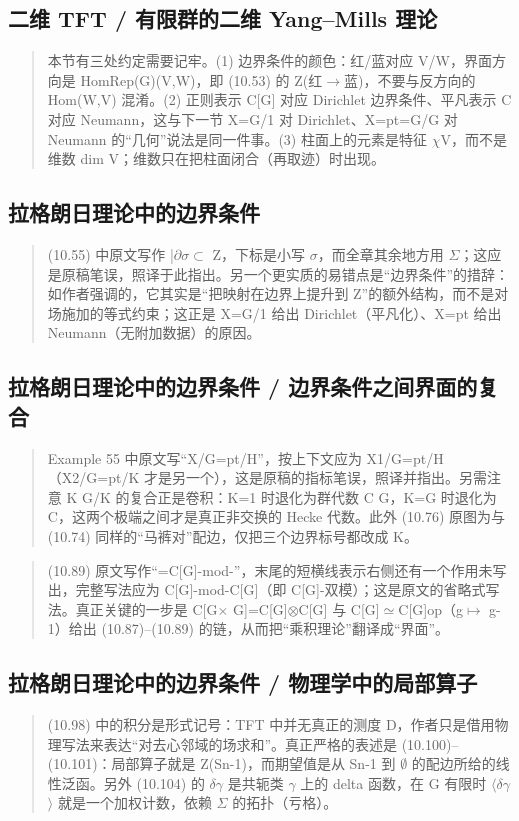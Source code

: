 \subsection*{二维 TFT / 有限群的二维 Yang--Mills 理论}
\begin{quote}\small
本节有三处约定需要记牢。(1) 边界条件的颜色：红/蓝对应 V/W，界面方向是 HomRep(G)(V,W)，即 (10.53) 的 Z(红$\to$蓝)，不要与反方向的 Hom(W,V) 混淆。(2) 正则表示 C[G] 对应 Dirichlet 边界条件、平凡表示 C 对应 Neumann，这与下一节 X=G/1 对 Dirichlet、X=pt=G/G 对 Neumann 的“几何”说法是同一件事。(3) 柱面上的元素是特征 $\chi$V，而不是维数 dim V；维数只在把柱面闭合（再取迹）时出现。
\end{quote}

\subsection*{拉格朗日理论中的边界条件}
\begin{quote}\small
(10.55) 中原文写作 |$\partial$$\sigma$$\subset$ Z，下标是小写 $\sigma$，而全章其余地方用 $\Sigma$；这应是原稿笔误，照译于此指出。另一个更实质的易错点是“边界条件”的措辞：如作者强调的，它其实是“把映射在边界上提升到 Z”的额外结构，而不是对场施加的等式约束；这正是 X=G/1 给出 Dirichlet（平凡化）、X=pt 给出 Neumann（无附加数据）的原因。
\end{quote}

\subsection*{拉格朗日理论中的边界条件 / 边界条件之间界面的复合}
\begin{quote}\small
Example 55 中原文写“X/G=pt/H”，按上下文应为 X1/G=pt/H（X2/G=pt/K 才是另一个），这是原稿的指标笔误，照译并指出。另需注意 K G/K 的复合正是卷积：K=1 时退化为群代数 C G，K=G 时退化为 C，这两个极端之间才是真正非交换的 Hecke 代数。此外 (10.76) 原图为与 (10.74) 同样的“马裤对”配边，仅把三个边界标号都改成 K。
\end{quote}

\begin{quote}\small
(10.89) 原文写作“=C[G]-mod-”，末尾的短横线表示右侧还有一个作用未写出，完整写法应为 C[G]-mod-C[G]（即 C[G]-双模）；这是原文的省略式写法。真正关键的一步是 C[G$\times$ G]=C[G]$\otimes$C[G] 与 C[G]$\simeq$C[G]op（g$\mapsto$ g-1）给出 (10.87)--(10.89) 的链，从而把“乘积理论”翻译成“界面”。
\end{quote}

\subsection*{拉格朗日理论中的边界条件 / 物理学中的局部算子}
\begin{quote}\small
(10.98) 中的积分是形式记号：TFT 中并无真正的测度 D，作者只是借用物理写法来表达“对去心邻域的场求和”。真正严格的表述是 (10.100)--(10.101)：局部算子就是 Z(Sn-1)，而期望值是从 Sn-1 到 $\emptyset$ 的配边所给的线性泛函。另外 (10.104) 的 $\delta$$\gamma$ 是共轭类 $\gamma$ 上的 delta 函数，在 G 有限时 $\langle$$\delta$$\gamma$$\rangle$ 就是一个加权计数，依赖 $\Sigma$ 的拓扑（亏格）。
\end{quote}

